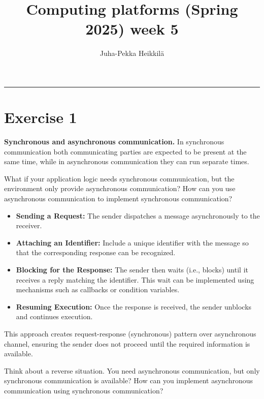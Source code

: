 \documentclass{article}
\title{Computing platforms (Spring 2025)\newline
week 5}
\author{Juha-Pekka Heikkilä}
\renewcommand{\maketitle}{%
  \begin{leftmark}
    \vspace*{\baselineskip} %



    \textbf{\fontsize{18}{36}\selectfont \thetitle} %

     \vspace{0.05cm} %
    \vspace{\baselineskip} %
     \rule{\textwidth}{0.4pt} %

   \end{leftmark}
}
\newcommand{\exercise}[1]{
    \section*{Exercise #1}
    \markboth{Exercise #1}{}
}
\begin{document}
\maketitle


\exercise{1}
\textbf{Synchronous and asynchronous communication.} In
synchronous communication both communicating parties are
expected to be present at the same time, while
in asynchronous communication they can run separate times.


\begin{enumerate}[label=\textbf{\makebox[1cm][l]{\Huge\text{(\stylishfont\alph*)}}}, leftmargin=!, labelindent=0pt]
  \item What if your application logic needs synchronous
  communication, but the environment only provide asynchronous
  communication? How can you use asynchronous communication to
  implement synchronous communication?\newline

  \begin{itemize}
    \item \textbf{Sending a Request:} The sender dispatches
    a message asynchronously to the receiver.
    \item \textbf{Attaching an Identifier:} Include a unique
    identifier with the message so that the corresponding
    response can be recognized.
    \item \textbf{Blocking for the Response:} The sender then
    waits (i.e., blocks) until it receives a reply matching
    the identifier. This wait can be implemented using
    mechanisms such as callbacks or condition variables.
    \item \textbf{Resuming Execution:} Once the response is
    received, the sender unblocks and continues execution.
  \end{itemize}


This approach creates request-response (synchronous) pattern
over asynchronous channel, ensuring the sender does not proceed
until the required information is available.\newline




  \item Think about a reverse situation.
  You need asynchronous communication, but only synchronous
  communication is available? How can you implement
  asynchronous communication using synchronous communication?\newline


\end{enumerate}
\end{document}
